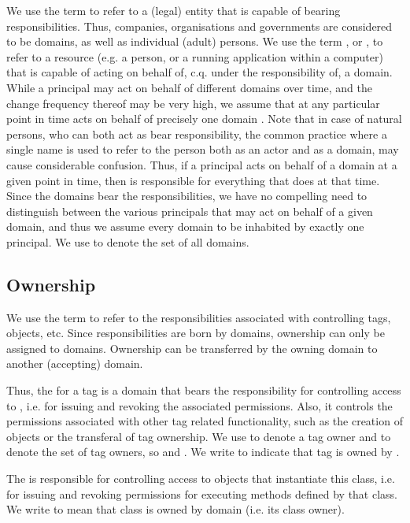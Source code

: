 We use the term  to refer to a (legal) entity that is capable of bearing responsibilities. 
Thus, companies, organisations and governments are considered to be domains, 
as well as individual (adult) persons. 
We use the term , or , to refer to a resource 
(e.g. a person, or a running application within a computer) 
that is capable of acting on behalf of, c.q. under the responsibility of, a domain.
While a principal  may act on behalf of different domains over time, 
and the change frequency thereof may be very high, 
we assume that at any particular point in time  acts on behalf of precisely one domain .
Note that in case of natural persons, who can both act as bear responsibility, the common practice where a single name is used to refer to the person both as an actor and as a domain, may cause considerable confusion. 
Thus, if a principal  acts on behalf of a domain  at a given point in time,
 then  is responsible for everything that  does at that time.
Since the domains bear the responsibilities, we have no compelling need to distinguish 
between the various principals that may act on behalf of a given domain, and thus 
we assume every domain to be inhabited by exactly one principal. 
We use  to denote the set of all domains. 


\subsection{Ownership}

We use the term  to refer to the responsibilities associated
with controlling tags, objects, etc.
Since responsibilities are born by domains, ownership can only be assigned to
domains. Ownership can be transferred by the owning domain to another
(accepting) domain.  

Thus, the  for a tag  is a domain that bears the
responsibility for controlling access to , i.e. for issuing and
revoking the associated permissions. Also, it controls the permissions
associated with other tag related functionality, such as the creation of
objects or the transferal of tag ownership.  We use  to denote a
tag owner and  to denote the set of tag owners, so
 and .  We
write  to indicate that tag  is owned by
.

The  is responsible for
controlling access to objects that instantiate this class,
i.e. for issuing and revoking permissions for executing methods defined by that
class. 
We write  to mean that class  is owned
by domain  (i.e. its class owner). 


